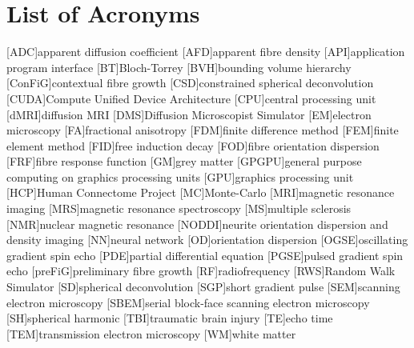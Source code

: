 
\chapter*{List of Acronyms}

\makeatletter
\patchcmd{\AC@@acro}{] #3}{] \MakeUppercase #3}{}{}
\patchcmd{\AC@@acro}{] #3}{] \MakeUppercase #3}{}{}
\makeatother
\begin{acronym}
  [ADC]{apparent diffusion coefficient}
  [AFD]{apparent fibre density}
  [API]{application program interface}
  [BT]{Bloch-Torrey}
  [BVH]{bounding volume hierarchy}
  [ConFiG]{contextual fibre growth}
  [CSD]{constrained spherical deconvolution}
  [CUDA]{Compute Unified Device Architecture}
  [CPU]{central processing unit}
  [dMRI]{diffusion MRI}
  [DMS]{Diffusion Microscopist Simulator}
  [EM]{electron microscopy}
  [FA]{fractional anisotropy}
  [FDM]{finite difference method}
  [FEM]{finite element method}
  [FID]{free induction decay}
  [FOD]{fibre orientation dispersion}
  [FRF]{fibre response function}
  [GM]{grey matter}
  [GPGPU]{general purpose computing on graphics processing units}
  [GPU]{graphics processing unit}
  [HCP]{Human Connectome Project}
  [MC]{Monte-Carlo}
  [MRI]{magnetic resonance imaging}
  [MRS]{magnetic resonance spectroscopy}
  [MS]{multiple sclerosis}
  [NMR]{nuclear magnetic resonance}
  [NODDI]{neurite orientation dispersion and density imaging}
  [NN]{neural network}
  [OD]{orientation dispersion}
  [OGSE]{oscillating gradient spin echo}
  [PDE]{partial differential equation}
  [PGSE]{pulsed gradient spin echo}
  [preFiG]{preliminary fibre growth}
  [RF]{radiofrequency}
  [RWS]{Random Walk Simulator}
  [SD]{spherical deconvolution}
  [SGP]{short gradient pulse}
  [SEM]{scanning electron microscopy}
  [SBEM]{serial block-face scanning electron microscopy}
  [SH]{spherical harmonic}
  [TBI]{traumatic brain injury}
  [TE]{echo time}
  [TEM]{transmission electron microscopy}
  [WM]{white matter}
\end{acronym}


